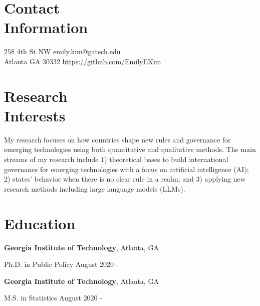\documentclass[margin,line, 10pt]{res}
\begin{document}

\begin{resume}

\section{\sc Contact \\Information}
258 4th St NW \hfill {emily.kim@gatech.edu}\\
Atlanta GA 30332  \hfill \href{https://github.com/EmilyEKim/CV.git/}{\texttt https://github.com/EmilyEKim}


\section{\sc Research\\ Interests}
My research focuses on how countries shape new rules and governance for emerging technologies using both quantitative and qualitative methods. The main streams of my research include 1) theoretical bases to build international governance for emerging technologies with a focus on artificial intelligence (AI); 2) states' behavior when there is no clear rule in a realm; and 3) applying new research methods including large language models (LLMs). 

\section{Education}
\textbf{Georgia Institute of Technology}, Atlanta, GA

\vspace{-0.4cm}
Ph.D. in Public Policy \hfill {August 2020 - }

\textbf{Georgia Institute of Technology}, Atlanta, GA

\vspace{-0.4cm}
M.S. in Statistics \hfill {August 2020 -}


\end{resume}
\end{document}

